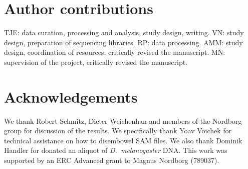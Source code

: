 \documentclass[10pt,letterpaper]{article}
\begin{document}
\section*{Author contributions}

TJE: data curation, processing and analysis, study design, writing.
VN: study design, preparation of sequencing libraries.
RP: data processing.
AMM: study design, coordination of resources, critically revised the manuscript.
MN: supervision of the project, critically revised the manuscript.

\section*{Acknowledgements}

We thank Robert Schmitz, Dieter Weichenhan and members of the Nordborg group for discussion of the results.
We specifically thank Yoav Voichek for technical assistance on how to disembowel SAM files.
We also thank Dominik Handler for donated an aliquot of \emph{D.~melanogaster} DNA.
This work was supported by an ERC Advanced grant to Magnus Nordborg (789037).

\nolinenumbers


\end{document}
